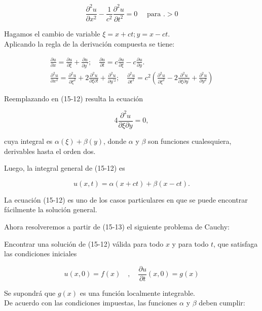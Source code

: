 \documentclass[10pt]{article}
\theoremstyle{plain}
\theoremstyle{definition}
\theoremstyle{remark}
\begin{document}
\begin{equation*}
\frac{\partial^{2} u}{\partial x^{2}}-\frac{1}{c^{2}} \frac{\partial^{2} u}{\partial t^{2}}=0 \quad \text { para } .>0 \tag{$15\cdot12$}
\end{equation*}


Hagamos el cambio de variable $\xi=x+c t ; y=x-c t$.\\
Aplicando la regla de la derivación compuesta se tiene:

$$
\begin{gathered}
\frac{\partial u}{\partial x}=\frac{\partial u}{\partial \xi}+\frac{\partial u}{\partial y^{\prime}} ; \quad \frac{\partial u}{\partial t}=c \frac{\partial u}{\partial \xi}-c \frac{\partial u}{\partial y} . \\
\frac{\partial^{2} u}{\partial x^{2}}=\frac{\partial^{2} u}{\partial \xi^{2}}+2 \frac{\partial^{2} u}{\partial \xi \partial!}+\frac{\partial^{2} u}{\partial y^{\prime 2}} ; \quad \frac{\partial^{2} u}{\partial t^{2}}=c^{2}\left(\frac{\partial^{2} u}{\partial \xi^{2}}-2 \frac{\partial^{2} u}{\partial \xi \partial y^{\prime}}+\frac{\partial^{2} u}{\partial y^{2}}\right)
\end{gathered}
$$

Reemplazando en (15-12) resulta la ecuación

$$
4 \frac{\partial^{2} u}{\partial \xi \partial y}=0,
$$

cuya integral es $\alpha(\xi)+\beta(y)$, donde $\alpha$ y $\beta$ son funciones cualesquiera, derivables hasta el orden dos.

Luego, la integral general de (15-12) es


\begin{equation*}
u(x, t)=\alpha(x+c t)+\beta(x-c t) . \tag{15-13}
\end{equation*}


La ecuación (15-12) es uno de los casos particulares en que se puede encontrar fácilmente la solución general.

Ahora resolveremos a partir de (15-13) el siguiente problema de Cauchy:

Encontrar una solución de (15-12) válida para todo $x$ y para todo $t$, que satisfaga las condiciones iniciales

$$
u(x, 0)=f(x) \quad, \quad \frac{\partial u}{\partial t}(x, 0)=g(x)
$$

Se supondrá que $g(x)$ es una función localmente integrable.\\
De acuerdo con las condiciones impuestas, las funciones $\alpha$ y $\beta$ deben cumplir:
\end{document}
